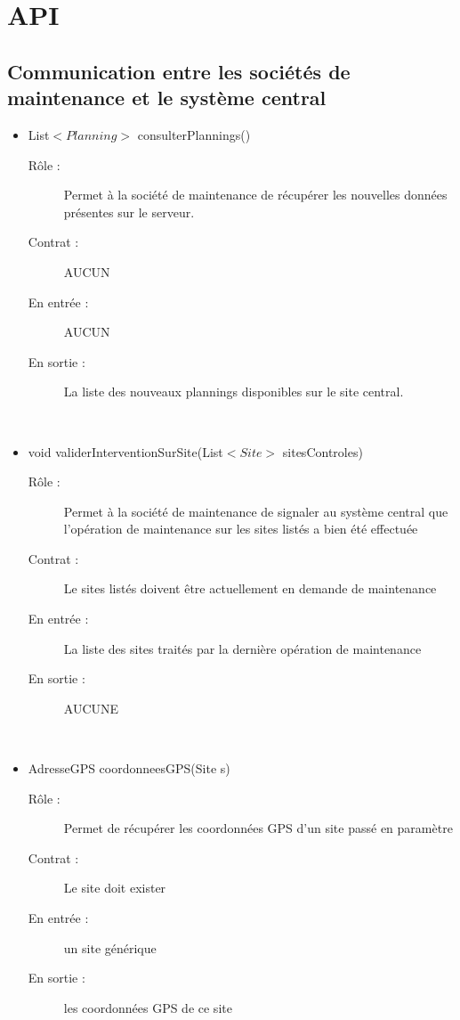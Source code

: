 \section{API}

\subsection{Communication entre les sociétés de maintenance et le système central}
\begin{itemize}
	\item List$<Planning>$ consulterPlannings()
	\begin{description} 
		\item[Rôle :] Permet à la société de maintenance de récupérer les nouvelles données présentes sur le serveur.
		\item[Contrat :] AUCUN
		\item[En entrée :] AUCUN
		\item[En sortie :] La liste des nouveaux plannings disponibles sur le site central.
	\end{description}
	~\\
	\item void validerInterventionSurSite(List$<Site>$ sitesControles)
	\begin{description} 
		\item[Rôle :] Permet à la société de maintenance de signaler au système central que l'opération de maintenance sur les sites listés a bien  été effectuée
		\item[Contrat :] Le sites listés doivent être actuellement en demande de maintenance
		\item[En entrée :] La liste des sites traités par la dernière opération de maintenance
		\item[En sortie :] AUCUNE
	\end{description}
	~\\
	\item AdresseGPS coordonneesGPS(Site s)
	\begin{description} 
		\item[Rôle :] Permet de récupérer les coordonnées GPS d'un site passé en paramètre
		\item[Contrat :] Le site doit exister
		\item[En entrée :] un site générique
		\item[En sortie :] les coordonnées GPS de ce site
	\end{description}
	~\\

\end{itemize}

